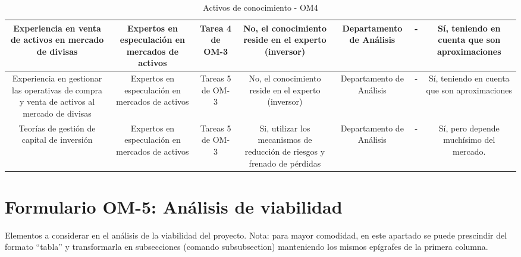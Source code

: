 \begin{table}[H]
{\begin{tabular}{|c|c|c|c|c|c|c|}
      \hline
      \multicolumn{1}{|p{4.0cm}|}{\centering Experiencia en venta de activos en mercado de divisas} & \multicolumn{1}{|p{3.0cm}|}{\centering Expertos en especulación en mercados de activos} & \multicolumn{1}{|p{3.0cm}|}{\centering Tarea 4 de OM-3} & \multicolumn{1}{|p{3.0cm}|}{\centering No, el conocimiento reside en el experto (inversor)} &  Departamento de Análisis  & - & \multicolumn{1}{|p{3.0cm}|}{\centering Sí, teniendo en cuenta que son aproximaciones} \\
      \hline
      \multicolumn{1}{|p{4.0cm}|}{\centering Experiencia en gestionar las operativas de compra y venta de activos al mercado de divisas} & \multicolumn{1}{|p{3.0cm}|}{\centering Expertos en especulación en mercados de activos} & \multicolumn{1}{|p{3.0cm}|}{\centering Tareas 5 de OM-3} & \multicolumn{1}{|p{3.0cm}|}{\centering No, el conocimiento reside en el experto (inversor)} &  Departamento de Análisis  & - & \multicolumn{1}{|p{3.0cm}|}{\centering Sí, teniendo en cuenta que son aproximaciones} \\
      \hline
      \multicolumn{1}{|p{4.0cm}|}{\centering Teorías de gestión de capital de inversión} & \multicolumn{1}{|p{3.0cm}|}{\centering Expertos en especulación en mercados de activos} & \multicolumn{1}{|p{3.0cm}|}{\centering Tareas 5 de OM-3} & \multicolumn{1}{|p{3.0cm}|}{\centering Si, utilizar los mecanismos de reducción de riesgos y frenado de pérdidas} &  Departamento de Análisis  & - & \multicolumn{1}{|p{3.0cm}|}{\centering Sí, pero depende muchísimo del mercado.} \\
      \hline
    \end{tabular}
  }
	\caption{\label{tab:OM4}Activos de conocimiento - OM4}
\end{table}


\section{Formulario OM-5: Análisis de viabilidad}


Elementos a considerar en el análisis de la viabilidad del proyecto. Nota: para mayor comodidad, en este apartado se puede prescindir del formato ``tabla'' y transformarla en subsecciones (comando subsubsection) manteniendo los mismos epígrafes de la primera columna.


